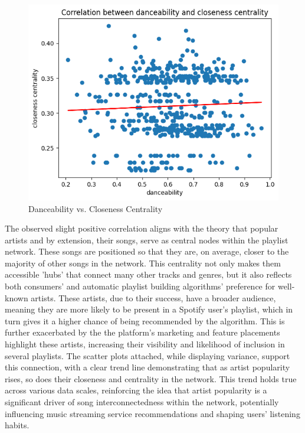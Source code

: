 \documentclass[conference]{IEEEtran}
\begin{document}
\begin{figure}[h!]
    \centering
    \includegraphics[width=1\linewidth]{images/1.png}
    \caption{Danceability vs. Closeness Centrality}
    \label{fig:enter-label}
\end{figure}

The observed slight positive correlation aligns with the theory that popular artists and by extension, their songs, serve as central nodes within the playlist network. These songs are positioned so that they are, on average, closer to the majority of other songs in the network. This centrality not only makes them accessible 'hubs' that connect many other tracks and genres, but it also reflects both consumers' and automatic playlist building algorithms' preference for well-known artists. These artists, due to their success, have a broader audience, meaning they are more likely to be present in a Spotify user's playlist, which in turn gives it a higher chance of being recommended by the algorithm. This is further exacerbated by the the platform's marketing and feature placements highlight these artists, increasing their visibility and likelihood of inclusion in several playlists. The scatter plots attached, while displaying variance, support this connection, with a clear trend line demonstrating that as artist popularity rises, so does their closeness and centrality in the network. This trend holds true across various data scales, reinforcing the idea that artist popularity is a significant driver of song interconnectedness within the network, potentially influencing music streaming service recommendations and shaping users' listening habits. 
\end{document}
